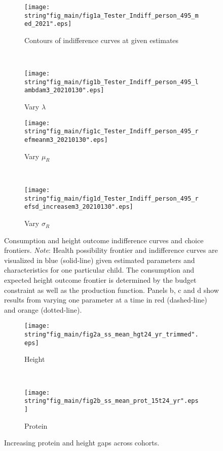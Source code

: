 
\newcommand{\subFigWidth}{0.50}
\begin{figure}[H]
    \centering
    \begin{subfigure}[b]{\subFigWidth\textwidth}
        \centering
        \texttt{[image: \\string"fig\_main/fig1a\_Tester\_Indiff\_person\_495\_med\_2021".eps]}
        \caption{Contours of indifference curves at given estimates}
    \end{subfigure}~
	\begin{subfigure}[b]{\subFigWidth\textwidth}
	    \centering
    	\texttt{[image: \\string"fig\_main/fig1b\_Tester\_Indiff\_person\_495\_lambdam3\_20210130".eps]}
    	\caption{Vary $\lambda$}
	\end{subfigure}
	\par\medskip
	\begin{subfigure}[b]{\subFigWidth\textwidth}
        \centering
        \texttt{[image: \\string"fig\_main/fig1c\_Tester\_Indiff\_person\_495\_refmeanm3\_20210130".eps]}
        \caption{Vary $\mu_{R}$}
    \end{subfigure}~
	\begin{subfigure}[b]{\subFigWidth\textwidth}
	    \centering
	    \texttt{[image: \\string"fig\_main/fig1d\_Tester\_Indiff\_person\_495\_refsd\_increasem3\_20210130".eps]}
	    \caption{Vary $\sigma_{R}$}
	\end{subfigure}
	\caption{Consumption and height outcome indifference curves and choice frontiers. \emph{Note}: Health possibility frontier and indifference curves are visualized in blue (solid-line) given estimated parameters and characteristics for one particular child. The consumption and expected height outcome frontier is determined by the budget constraint as well as the production function. Panels b, c and d show results from varying one parameter at a time in red (dashed-line) and orange (dotted-line).}
	\label{fig:indiff}
\end{figure}
\pagebreak

\begin{figure}[H]
    \centering
    \begin{subfigure}[t]{.43\textwidth}
        \centering
        \texttt{[image: \\string"fig\_main/fig2a\_ss\_mean\_hgt24\_yr\_trimmed".eps]}
        \caption{Height}
    \end{subfigure}~
	\begin{subfigure}[t]{0.57\textwidth}
	    \centering
    	\texttt{[image: \\string"fig\_main/fig2b\_ss\_mean\_prot\_15t24\_yr".eps]}
    	\caption{Protein}
	\end{subfigure}
	\caption{Increasing protein and height gaps across cohorts.}
	\label{fig:PortHgtGap}
\end{figure}
\pagebreak

\clearpage


\clearpage

\clearpage

\clearpage
\pagebreak
